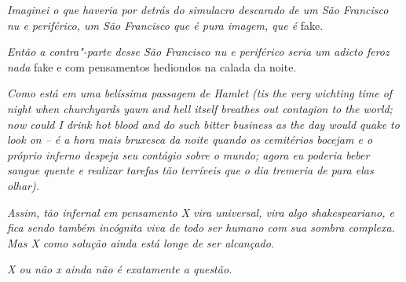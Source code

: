 \emph{Imaginei o que haveria por detrás do simulacro descarado de um São
Francisco nu e periférico, um São Francisco que é pura imagem, que é}
fake.~

\emph{Então a contra"-parte desse São Francisco nu e periférico seria um
adicto feroz nada} fake {e com pensamentos hediondos na calada da noite.}~

\emph{Como está em uma belíssima passagem de Hamlet (tis the very
wichting time of night when churchyards yawn and hell itself breathes
out contagion to the world; now could I drink hot blood and do such
bitter business as the day would quake to look on -- é a hora mais
bruxesca da noite quando os cemitérios bocejam e o próprio inferno
despeja seu contágio sobre o mundo; agora eu poderia beber sangue quente
e realizar tarefas tão terríveis que o dia tremeria de para elas
olhar).}~

\emph{Assim, tão infernal em pensamento X vira universal, vira algo
shakespeariano, e fica sendo também incógnita viva de todo ser humano
com sua sombra complexa. Mas X como solução ainda está longe de ser
alcançado.}

\emph{X ou não x ainda não é exatamente a questão.~}
